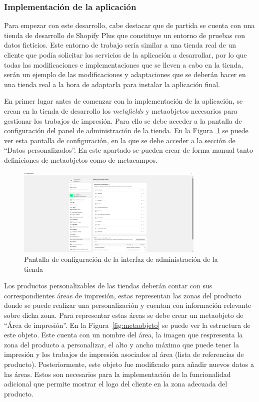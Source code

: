 \documentclass[11pt]{article}
\begin{document}
\subsubsection{Implementación de la aplicación}

Para empezar con este desarrollo, cabe destacar que de partida se cuenta con una tienda de desarrollo de Shopify Plus que constituye un entorno de pruebas con datos ficticios.
Este entorno de trabajo sería similar a una tienda real de un cliente que podía solicitar los servicios de la aplicación a desarrollar, por lo que todas las modificaciones e implementaciones
que se lleven a cabo en la tienda, serán un ejemplo de las modificaciones y adaptaciones que se deberán hacer en una tienda real a la hora de adaptarla para instalar la aplicación final.

En primer lugar antes de comenzar con la implementación de la aplicación, se crean en la tienda de desarrollo los \textit{metafields} y metaobjetos necesarios para gestionar
los trabajos de impresión. Para ello se debe acceder a la pantalla de configuración del panel de administración de la tienda. En la Figura~\ref{fig:configuracionMetafields} se puede ver
esta pantalla de configuración, en la que se debe acceder a la sección de ``Datos personalizados''. En este apartado se pueden crear de forma manual
tanto definiciones de metaobjetos como de metacampos.

\begin{figure}[H]
    \centering
    \includegraphics[width=0.8\textwidth]{imagenesUS2/configuracionAdministradorTienda.png}
    \caption{\label{fig:configuracionMetafields}Pantalla de configuración de la interfaz de administración de la tienda}
    \vspace{\fill}
\end{figure}

Los productos personalizables de las tiendas deberán contar con sus correspondientes áreas de impresión, estas representan
las zonas del producto donde se puede realizar una personalización y cuentan con información relevante sobre dicha zona.
Para representar estas áreas se debe crear un metaobjeto de ``Área de impresión''. En la Figura~\ref{fig:metaobjeto} se puede ver la estructura de este 
objeto. Este cuenta con un nombre del área, la imagen que respresenta la zona del producto a personalizar, el alto y ancho máximo que puede tener la impresión y 
los trabajos de impresión asociados al área (lista de referencias de producto). Posteriormente, este objeto fue modificado para añadir nuevos datos a las áreas. Estos son necesarios
para la implementación de la funcionalidad adicional que permite mostrar el logo del cliente en la zona adecuada del producto. 
\end{document}
